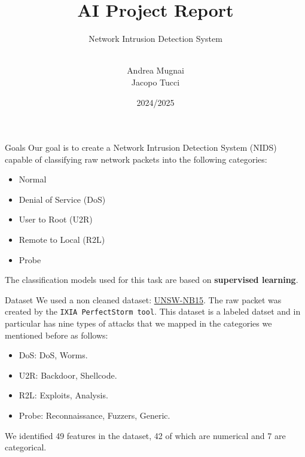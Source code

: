 \documentclass[12pt,aspectratio=169,notheorems]{beamer}
\title{\LARGE AI Project Report}
\subtitle{Network Intrusion Detection System}
\author{\\ Andrea Mugnai \\ Jacopo Tucci}
\date{2024/2025}
\begin{document}
\maketitle

\begin{frame}{Goals}
    Our goal is to create a Network Intrusion Detection System (NIDS) capable of classifying raw network packets into the following categories:
    \begin{itemize}
        \item Normal
        \item Denial of Service (DoS)
        \item User to Root (U2R)
        \item Remote to Local (R2L)
        \item Probe
    \end{itemize}
    The classification models used for this task are based on \textbf{supervised learning}.
\end{frame}

\begin{frame}{Dataset}
    We used a non cleaned dataset: \href{https://research.unsw.edu.au/projects/unsw-nb15-dataset}{UNSW-NB15}. 
    The raw packet was created by the \texttt{IXIA PerfectStorm tool}. This dataset is a labeled datset and in particular has nine types of attacks 
    that we mapped in the categories we mentioned before as follows:
    \begin{itemize}
        \item DoS: DoS, Worms.
        \item U2R: Backdoor, Shellcode.
        \item R2L: Exploits, Analysis.
        \item Probe: Reconnaissance, Fuzzers, Generic.
    \end{itemize}
        We identified 49 features in the dataset, 42 of which are numerical and 7 are categorical.
\end{frame}
\end{document}
